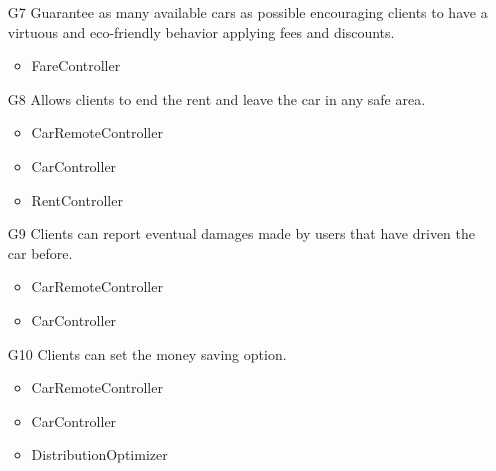 \begin{itemize}
\item [G7]Guarantee as many available cars as possible encouraging clients to have a virtuous and eco-friendly behavior applying fees and discounts.
\begin{itemize}
\item FareController
\end{itemize}

\item [G8]Allows clients to end the rent and leave the car in any safe area.
\begin{itemize}
\item CarRemoteController
\item CarController
\item RentController
\end{itemize}

\item [G9]Clients can report eventual damages made by users that have driven the car before.
\begin{itemize}
\item CarRemoteController 
\item CarController
\end{itemize}

\item [G10]Clients can set the money saving option.
\begin{itemize}
\item CarRemoteController
\item CarController
\item DistributionOptimizer
\end{itemize}

\end{itemize}